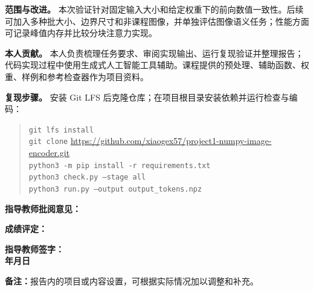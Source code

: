 \documentclass[a4paper,12pt]{article}
\begin{document}
\textbf{范围与改进。} 本次验证针对固定输入大小和给定权重下的前向数值一致性。后续可加入多种批大小、边界尺寸和非课程图像，并单独评估图像语义任务；性能方面可记录峰值内存并比较分块注意力实现。

\textbf{本人贡献。} 本人负责梳理任务要求、审阅实现输出、运行复现验证并整理报告；代码实现过程中使用生成式人工智能工具辅助。课程提供的预处理、辅助函数、权重、样例和参考检查器作为项目资料。

\textbf{复现步骤。} 安装 Git LFS 后克隆仓库；在项目根目录安装依赖并运行检查与编码：
\begin{quote}\small
\texttt{git lfs install}\\
\texttt{git clone} \url{https://github.com/xiaogex57/project1-numpy-image-encoder.git}\\
\texttt{python3 -m pip install -r requirements.txt}\\
\texttt{python3 check.py --stage all}\\
\texttt{python3 run.py --output output\_tokens.npz}
\end{quote}

\vspace{0.3cm}
\begin{center}
\end{center}

\newpage
\thispagestyle{plain}
\vspace*{1cm}
\noindent\textbf{指导教师批阅意见：}
\vspace{6cm}

\noindent\textbf{成绩评定：}
\vspace{3cm}

\noindent\hfill\textbf{指导教师签字：}\quad\quad\quad\quad\quad\\[0.5cm]
\hfill\textbf{年}\quad\textbf{月}\quad\textbf{日}

\vfill
\noindent\textbf{备注：}报告内的项目或内容设置，可根据实际情况加以调整和补充。
\end{document}
